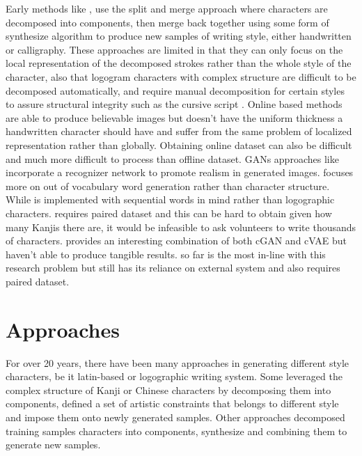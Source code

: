 \documentclass[12pt]{report}
\begin{document}
Early methods like \cite{automatic-calligraphy}, \cite{automatic-handwritten} use the split and merge approach where characters are decomposed into components, then merge back together using some form of synthesize algorithm to produce new samples of writing style, either handwritten or calligraphy. These approaches are limited in that they can only focus on the local representation of the decomposed strokes rather than the whole style of the character, also that logogram characters with complex structure are difficult to be decomposed automatically, and require manual decomposition for certain styles to assure structural integrity such as the cursive script \cite{intel-system}.
Online based methods \cite{online-kanji} \cite{online-kanji-2} are able to produce believable images but doesn’t have the uniform thickness a handwritten character should have and suffer from the same problem of localized representation rather than globally. Obtaining online dataset can also be difficult and much more difficult to process than offline dataset.
GANs approaches like \cite{zi2zi}\cite{handwritten-cgan}\cite{calligan}\cite{scrabble-gan}\cite{gan-writting} incorporate a recognizer network to promote realism in generated images. \cite{gan-writting} focuses more on out of vocabulary word generation rather than character structure. While \cite{scrabble-gan} is implemented with sequential words in mind rather than logographic characters. \cite{zi2zi} requires paired dataset and this can be hard to obtain given how many Kanjis there are, it would be infeasible to ask volunteers to write thousands of characters. \cite{handwritten-cgan} provides an interesting combination of both cGAN \cite{cgan} and cVAE \cite{cvae} but haven’t able to produce tangible results. \cite{calligan} so far is the most in-line with this research problem but still has its reliance on external system \cite{casia} and also requires paired dataset.

\section{Approaches}
For over 20 years, there have been many approaches in generating different style characters, be it latin-based or logographic writing system.
Some leveraged the complex structure of Kanji or Chinese characters by decomposing them into components, defined a set of artistic constraints that belongs to different style and impose them onto newly generated samples. Other approaches decomposed training samples characters into components, synthesize and combining them to generate new samples.
\end{document}
